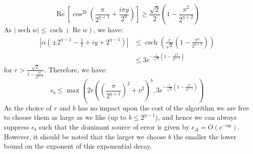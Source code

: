 \documentclass[aps,floatfix,10pt,amssymb,amsfont,amsmath,superscriptaddress,float,nofootinbib,longbibliography,nobalancelastpage,twocolumn]{revtex4-2}
\begin{document}
\begin{equation}
    \operatorname{Re} \left[\cos^{2b}\left(\frac{\pi}{2^{\eta+1}} +\frac{i \pi y}{2^{\eta}}\right) \right] \geq \frac{\sqrt{2}}{2}\left(1-\frac{\pi^2}{2^{\eta+2}}\right)
\end{equation}
As $|\operatorname{sech} w| \leq \operatorname{csch}(\operatorname{Re} w)$, we have:
\begin{align}
    \left|\alpha(\pm2^{\eta-1}-\frac12+iy+2^{\eta-1})\right| &\leq \operatorname{csch}\left(\frac{r}{\sqrt{2}}\left(1-\frac{\pi^2}{2^{\eta+2}}\right)\right)\\
    &\leq 3e^{-\frac{r}{\sqrt{2}}\left(1-\frac{\pi^2}{2^{\eta+2}}\right)}
\end{align}
for $r > \frac{\sqrt{2}}{1-\frac{\pi^2}{2^{\eta+2}}}$. Therefore, we have:
\begin{equation}
    \epsilon_b \leq \max\left(2r\left(
\left(\frac{\pi}{2^{\eta+1}}\right)^2+\nu^2
\right)^{b},3e^{-\frac{r}{\sqrt{2}}\left(1-\frac{\pi^2}{2^{\eta+2}}\right)}\right)
\end{equation}
As the choice of $r$ and $b$ has no impact upon the cost of the algorithm we are free to choose them as large as we like (up to $b\leq 2^{\eta-1}$), and hence we can always suppress $\epsilon_b$ such that the dominant source of error is given by $\epsilon_{\Delta} = O(e^{-\nu\mu})$. However, it should be noted that the larger we choose $b$ the smaller the lower bound on the exponent of this exponential decay.
\end{document}

